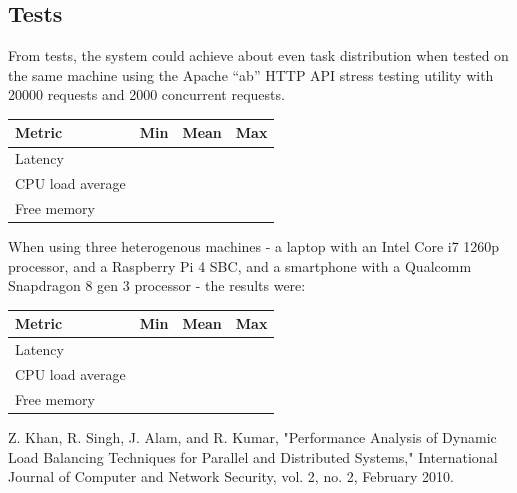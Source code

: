 \documentclass[conference]{IEEEtran}
\begin{document}
\subsection{Tests}

    From tests, the system could achieve about even task distribution when tested on the same machine using the Apache ``ab''
HTTP API stress testing utility with 20000 requests and 2000 concurrent requests.

    \begin{center}
        \centering
        \begin{tabular}{l|r|r|r}
            Metric & Min & Mean & Max \\
            \hline
            Latency & & & \\
            \hline
            CPU load average & & & \\
            \hline
            Free memory & & & \\
        \end{tabular}
         \label{experimental-study-metrics-same-machine}
    \end{center}

    When using three heterogenous machines - a laptop with an Intel Core i7 1260p processor, and a Raspberry Pi 4 SBC, and a smartphone
with a Qualcomm Snapdragon 8 gen 3 processor - the results were:

    \begin{center}
        \centering
        \begin{tabular}{l|r|r|r}
            Metric & Min & Mean & Max \\
            \hline
            Latency & & & \\
            \hline
            CPU load average & & & \\
            \hline
            Free memory & & & \\
        \end{tabular}
         \label{experimental-study-metrics-different-machines}
    \end{center}

\begin{thebibliography}{00}
     Z. Khan, R. Singh, J. Alam, and R. Kumar, "Performance Analysis
    of Dynamic Load Balancing Techniques for Parallel and Distributed
    Systems," International Journal of Computer and Network Security,
    vol. 2, no. 2, February 2010.
\end{thebibliography}
\end{document}
